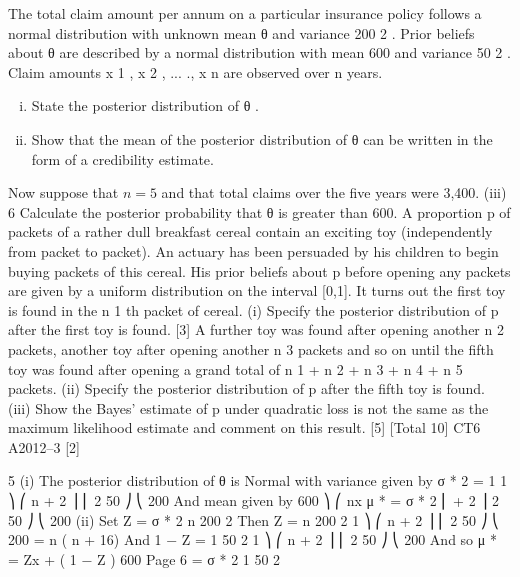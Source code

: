 \documentclass[a4paper,12pt]{article}
\begin{document}
\begin{enumerate}
The total claim amount per annum on a particular insurance policy follows a normal distribution with unknown mean θ and variance 200 2 . Prior beliefs about θ are described by a normal distribution with mean 600 and variance 50 2 . Claim amounts
x 1 , x 2 , ... ., x n are observed over n years.

\begin{enumerate}[(i)]
\item State the posterior distribution of θ .
\item Show that the mean of the posterior distribution of θ can be written in the
form of a credibility estimate.
\end{enumerate}

Now suppose that $n=5$ and that total claims over the five years were 3,400.
(iii)
6
Calculate the posterior probability that θ is greater than 600.
A proportion p of packets of a rather dull breakfast cereal contain an exciting toy (independently from packet to packet). An actuary has been persuaded by his children to begin buying packets of this cereal. His prior beliefs about p before
opening any packets are given by a uniform distribution on the interval [0,1]. It turns out the first toy is found in the n 1 th packet of cereal.
(i)
Specify the posterior distribution of p after the first toy is found.
[3]
A further toy was found after opening another n 2 packets, another toy after opening
another n 3 packets and so on until the fifth toy was found after opening a grand total
of n 1 + n 2 + n 3 + n 4 + n 5 packets.
(ii) Specify the posterior distribution of p after the fifth toy is found.
(iii) Show the Bayes’ estimate of p under quadratic loss is not the same as the
maximum likelihood estimate and comment on this result.
[5]
[Total 10]
CT6 A2012–3
[2]



5
(i)
The posterior distribution of θ is Normal with variance given by
σ * 2 =
1
1 ⎞
⎛ n
+ 2 ⎟
⎜
2
50 ⎠
⎝ 200
And mean given by
600 ⎞
⎛ nx
μ * = σ * 2 ⎜
+ 2 ⎟
2
50 ⎠
⎝ 200
(ii)
Set
Z = σ * 2
n
200 2
Then
Z =
n
200 2
1 ⎞
⎛ n
+ 2 ⎟
⎜
2
50 ⎠
⎝ 200
=
n
( n + 16)
And
1 − Z =
1
50 2
1 ⎞
⎛ n
+ 2 ⎟
⎜
2
50 ⎠
⎝ 200
And so
μ * = Zx + ( 1 − Z ) 600
Page 6
= σ * 2
1
50 2


\end{enumerate}
\end{document}
